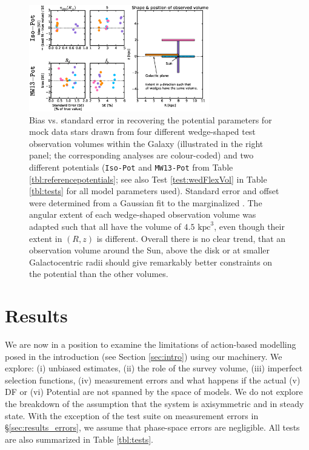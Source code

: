 


\begin{figure}[!htbp]
\centering
\includegraphics[width=0.7\textwidth]{figs/wedFlexVol_bias_vs_SE.eps}
\caption{Bias vs. standard error in recovering the potential parameters for mock data stars drawn from four different wedge-shaped test observation volumes within the Galaxy (illustrated in the right panel; the corresponding analyses are colour-coded) and two different potentials (\texttt{Iso-Pot} and \texttt{MW13-Pot} from Table \ref{tbl:referencepotentials}; see also Test \ref{test:wedFlexVol} in Table \ref{tbl:tests} for all model parameters used). Standard error and offset were determined from a Gaussian fit to the marginalized \pdf{}. The angular extent of each wedge-shaped observation volume was adapted such that all have the volume of $4.5 \text{ kpc}^3$, even though their extent in $(R,z)$ is different. Overall there is no clear trend, that an observation volume around the Sun, above the disk or at smaller Galactocentric radii should give remarkably better constraints on the potential than the other volumes.}
\label{fig:wedFlexVol_bias_vs_SE}
\end{figure}



\section{Results} \label{sec:results}

We are now in a position to examine the limitations of action-based modelling posed in the introduction (see Section \ref{sec:intro}) using our \RM{} machinery. We explore: (i) unbiased estimates, (ii) the role of the survey volume, (iii) imperfect selection functions, (iv) measurement errors and what happens if the actual (v) DF or (vi) Potential are not spanned by the space of models. We do not explore the breakdown of the assumption that the system is axisymmetric and
in steady state. With the exception of the test suite on measurement errors in \S\ref{sec:results_errors}, we assume that phase-space errors are negligible. All tests are also summarized in Table \ref{tbl:tests}. 

